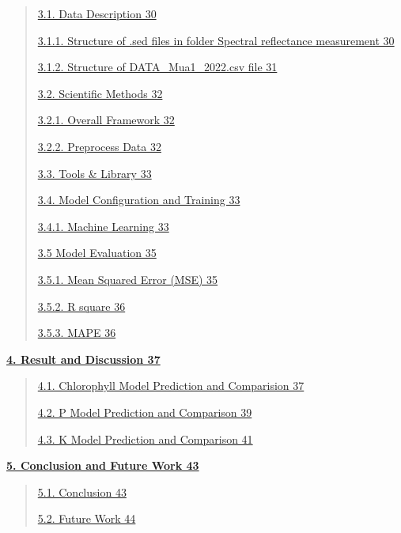 \documentclass[
]{article}
\begin{document}
\begin{quote}
\protect\hyperlink{data-description}{3.1. Data Description 30}

\protect\hyperlink{structure-of-.sed-files-in-folder-spectral-reflectance-measurement}{3.1.1.
Structure of .sed files in folder Spectral reflectance measurement 30}

\protect\hyperlink{structure-of-data_mua1_2022.csv-file}{3.1.2.
Structure of DATA\_Mua1\_2022.csv file 31}

\protect\hyperlink{scientific-methods}{3.2. Scientific Methods 32}

\protect\hyperlink{overall-framework}{3.2.1. Overall Framework 32}

\protect\hyperlink{preprocess-data}{3.2.2. Preprocess Data 32}

\protect\hyperlink{tools-library}{3.3. Tools \& Library 33}

\protect\hyperlink{model-configuration-and-training}{3.4. Model
Configuration and Training 33}

\protect\hyperlink{machine-learning-1}{3.4.1. Machine Learning 33}

\protect\hyperlink{model-evaluation}{3.5 Model Evaluation 35}

\protect\hyperlink{mean-squared-error-mse}{3.5.1. Mean Squared Error
(MSE) 35}

\protect\hyperlink{r-square}{3.5.2. R square 36}

\protect\hyperlink{mape}{3.5.3. MAPE 36}
\end{quote}

\protect\hyperlink{result-and-discussion}{\textbf{4. Result and
Discussion 37}}

\begin{quote}
\protect\hyperlink{chlorophyll-model-prediction-and-comparision}{4.1.
Chlorophyll Model Prediction and Comparision 37}

\protect\hyperlink{p-model-prediction-and-comparison}{4.2. P Model
Prediction and Comparison 39}

\protect\hyperlink{k-model-prediction-and-comparison}{4.3. K Model
Prediction and Comparison 41}
\end{quote}

\protect\hyperlink{conclusion-and-future-work}{\textbf{5. Conclusion and
Future Work 43}}

\begin{quote}
\protect\hyperlink{conclusion}{5.1. Conclusion 43}

\protect\hyperlink{future-work}{5.2. Future Work 44}
\end{quote}
\end{document}
